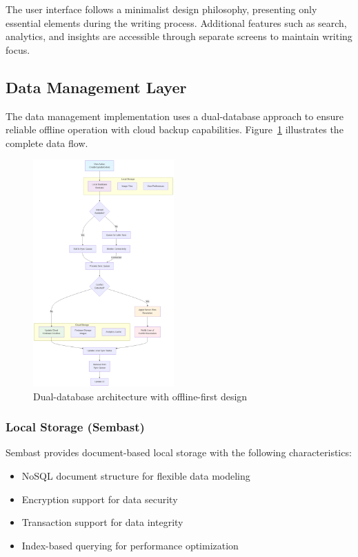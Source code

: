 \documentclass[conference]{IEEEtran}
\begin{document}
{\begin{IEEEkeywords}
The user interface follows a minimalist design philosophy, presenting only essential elements during the writing process. Additional features such as search, analytics, and insights are accessible through separate screens to maintain writing focus.

\subsection{Data Management Layer}

The data management implementation uses a dual-database approach to ensure reliable offline operation with cloud backup capabilities. Figure~\ref{fig:data-architecture} illustrates the complete data flow.

\begin{figure}[h]
\centering
\includegraphics[width=0.48\textwidth]{../THESIS-WRITING/files/imgs/mermaid_diagram.png}
\caption{Dual-database architecture with offline-first design}
\label{fig:data-architecture}
\end{figure}

\subsubsection{Local Storage (Sembast)}

Sembast provides document-based local storage with the following characteristics:
\begin{itemize}
\item NoSQL document structure for flexible data modeling
\item Encryption support for data security
\item Transaction support for data integrity
\item Index-based querying for performance optimization
\end{itemize}


\end{IEEEkeywords}}
\end{document}
